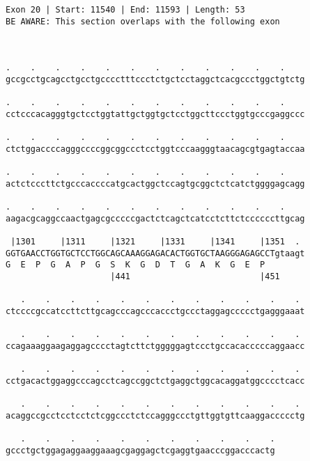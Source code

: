 \documentclass{article}
\begin{document}
\begin{Verbatim}
Exon 20 | Start: 11540 | End: 11593 | Length: 53
BE AWARE: This section overlaps with the following exon



.    .    .    .    .    .    .    .    .    .    .    .    
gccgcctgcagcctgcctgcccctttccctctgctcctaggctcacgccctggctgtctg
                                                            
.    .    .    .    .    .    .    .    .    .    .    .    
cctcccacagggtgctcctggtattgctggtgctcctggcttccctggtgcccgaggccc
                                                            
.    .    .    .    .    .    .    .    .    .    .    .    
ctctggaccccagggccccggcggccctcctggtcccaagggtaacagcgtgagtaccaa
                                                            
.    .    .    .    .    .    .    .    .    .    .    .    
actctcccttctgcccaccccatgcactggctccagtgcggctctcatctggggagcagg
                                                            
.    .    .    .    .    .    .    .    .    .    .    .    
aagacgcaggccaactgagcgcccccgactctcagctcatcctcttctccccccttgcag
                                                            
 |1301     |1311     |1321     |1331     |1341     |1351  . 
GGTGAACCTGGTGCTCCTGGCAGCAAAGGAGACACTGGTGCTAAGGGAGAGCCTgtaagt
G  E  P  G  A  P  G  S  K  G  D  T  G  A  K  G  E  P        
                     |441                          |451     
  
   .    .    .    .    .    .    .    .    .    .    .    . 
ctccccgccatccttcttgcagcccagcccaccctgccctaggagccccctgagggaaat
                                                            
   .    .    .    .    .    .    .    .    .    .    .    . 
ccagaaaggaagaggagcccctagtcttctgggggagtccctgccacacccccaggaacc
                                                            
   .    .    .    .    .    .    .    .    .    .    .    . 
cctgacactggaggcccagcctcagccggctctgaggctggcacaggatggcccctcacc
                                                            
   .    .    .    .    .    .    .    .    .    .    .    . 
acaggccgcctcctcctctcggccctctccagggccctgttggtgttcaaggaccccctg
                                                            
   .    .    .    .    .    .    .    .    .    .    .
gccctgctggagaggaaggaaagcgaggagctcgaggtgaacccggacccactg
                                                      

\end{Verbatim}
\end{document}

